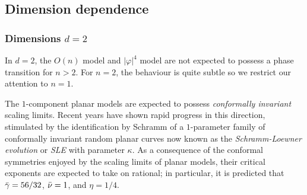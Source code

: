 
\subsection{Dimension dependence}

\subsubsection{Dimensions $d = 2$}

In $d = 2$, the $O(n)$ model and $|\varphi|^4$ model are not expected to possess
a phase transition for $n > 2$. For $n = 2$, the behaviour is quite subtle so
we restrict our attention to $n = 1$.

The $1$-component planar models are
expected to possess \emph{conformally invariant} scaling limits. Recent years
have shown rapid progress in this direction, stimulated
by the identification by Schramm \cite{Schramm00} of a $1$-parameter family of
conformally invariant random planar curves now known as the \emph{Schramm-Loewner
evolution} or \emph{SLE} with parameter $\kappa$. 
As a consequence of the conformal symmetries enjoyed by the scaling limits of planar
models, their critical exponents are expected to take on rational; in particular,
it is predicted that $\bar\gamma = 56/32$, $\bar\nu = 1$, and $\eta = 1/4$.


